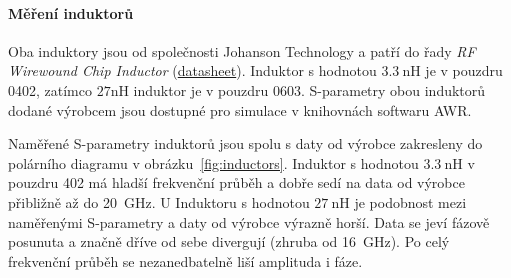\documentclass[11pt,a4paper]{article}
\begin{document}
\paragraph*{Měření induktorů} Oba induktory jsou od společnosti Johanson Technology a patří do řady \emph{RF Wirewound Chip Inductor} (\href{https://www.johansontechnology.com/wirewound-inductors}{datasheet}). Induktor s hodnotou $3.3\ \mathrm{nH}$ je v pouzdru 0402, zatímco $27\mathrm{nH}$ induktor je v pouzdru 0603. S-parametry obou induktorů dodané výrobcem jsou dostupné pro simulace v knihovnách softwaru AWR.

Naměřené S-parametry induktorů jsou spolu s daty od výrobce zakresleny do polárního diagramu v obrázku~\ref{fig:inductors}. Induktor s hodnotou $3.3\ \mathrm{nH}$ v pouzdru 402 má hladší frekvenční průběh a dobře sedí na data od výrobce přibližně až do 20~GHz. U Induktoru s hodnotou $27\ \mathrm{nH}$ je podobnost mezi naměřenými S-parametry a daty od výrobce výrazně horší. Data se jeví fázově posunuta a značně dříve od sebe divergují (zhruba od 16~GHz). Po celý frekvenční průběh se nezanedbatelně liší amplituda i fáze.
\end{document}
